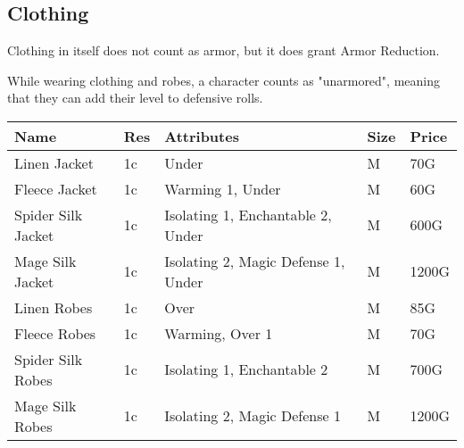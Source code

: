 \subsection{Clothing}\label{subsec:clothing}

Clothing in itself does not count as armor, but it does grant Armor Reduction.

While wearing clothing and robes, a character counts as "unarmored", meaning that they can add their level to defensive rolls.

\begin{longtable}{p{3cm} | p{1.5cm} | p{5cm} | p{1cm} | p{1.5cm}}
	Name & Res &   Attributes & Size & Price\\ \hline
	Linen Jacket & 1c & Under & M & 70G\\
	
	Fleece Jacket & 1c & Warming 1, Under & M & 60G\\
	
	Spider Silk Jacket & 1c & Isolating 1, Enchantable 2, Under & M & 600G\\
	
	Mage Silk Jacket & 1c & Isolating 2, Magic Defense 1, Under & M & 1200G\\
	
	Linen Robes & 1c & Over & M & 85G\\
	
	Fleece Robes & 1c & Warming, Over 1 & M & 70G\\

	Spider Silk Robes & 1c & Isolating 1, Enchantable 2 & M & 700G\\
	
	Mage Silk Robes & 1c & Isolating 2, Magic Defense 1 & M & 1200G\\
\end{longtable}